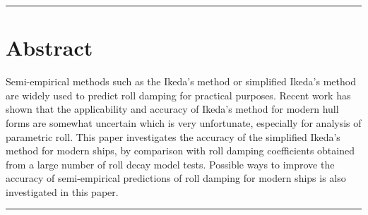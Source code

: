 {\footnotesize
\noindent\rule{\columnwidth}{0.4pt}
\section*{Abstract}\label{se:abstract}
Semi-empirical methods such as the Ikeda’s method or simplified Ikeda’s method are widely used to predict roll damping for practical purposes. Recent work has shown that the applicability and accuracy of Ikeda’s method for modern hull forms are somewhat uncertain which is very unfortunate, especially for analysis of parametric roll. 
This paper investigates the accuracy of the simplified Ikeda's method for modern ships, by comparison with roll damping coefficients obtained from a large number of roll decay model tests. Possible ways to improve the accuracy of semi-empirical predictions of roll damping for modern ships is also investigated in this paper.

}
\newline
\noindent\rule{\columnwidth}{0.4pt}